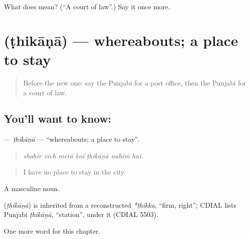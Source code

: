 \begin{tcolorbox}[breakable,colback=teal!4,colframe=teal!35!black,title={Before you move on}]
What does  mean? (\textquotedblleft{}A court of law\textquotedblright{}.) Say it once more.
\end{tcolorbox}
\section[\texorpdfstring{\pa{ਠਿਕਾਣਾ} (ṭhikāṇā)}{ਠਿਕਾਣਾ (ṭhikāṇā)}]{ (ṭhikāṇā) — whereabouts; a place to stay}

\label{lesson:PA-C267-thikana}



\begin{quote}
Before the new one: say the Punjabi for a post office, then the Punjabi for a court of law.
\end{quote}

\subsection*{You'll want to know: }
\textbf{} — \emph{ṭhikāṇā} — \textquotedblleft{}whereabouts; a place to stay\textquotedblright{}.

\begin{quote}
      
\end{quote}

\begin{quote}
\emph{shahir vich merā koī ṭhikāṇā nahīṁ hai.}
\end{quote}

\begin{quote}
I have no place to stay in the city.
\end{quote}

A masculine noun.

\begin{cousinweb}
\textbf{} (\emph{ṭhikāṇā}) is inherited from a reconstructed \emph{*ṭhīkka}, \textquotedblleft{}firm, right\textquotedblright{}; CDIAL lists Punjabi \emph{ṭhikāṇā}, \textquotedblleft{}station\textquotedblright{}, under it (CDIAL 5503).
\end{cousinweb}

\begin{grammarlens}[title={What you've built}]
One more word for this chapter.
\end{grammarlens}

